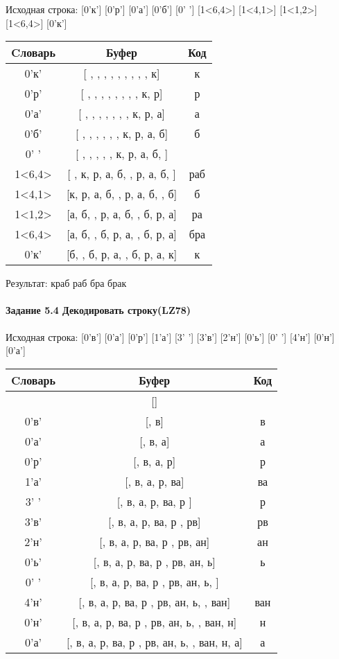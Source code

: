 \documentclass[a4paper, 12pt]{article}
\begin{document}
Исходная строка: [0'к'] [0'р'] [0'а'] [0'б'] [0' '] [1<6,4>] [1<4,1>] [1<1,2>] [1<6,4>] [0'к']\\
\begin{table}[h!]
\centering
\begin{tabular}{|c|c|c|}
\hline
 Cловарь & Буфер & Код  \\ \hline
0'к' & [ ,  ,  ,  ,  ,  ,  ,  ,  , к] & к
\\ \hline
0'р' & [ ,  ,  ,  ,  ,  ,  ,  , к, р] & р
\\ \hline
0'а' & [ ,  ,  ,  ,  ,  ,  , к, р, а] & а
\\ \hline
0'б' & [ ,  ,  ,  ,  ,  , к, р, а, б] & б
\\ \hline
0' ' & [ ,  ,  ,  ,  , к, р, а, б,  ] &  
\\ \hline
1<6,4> & [ , к, р, а, б,  , р, а, б,  ] & раб 
\\ \hline
1<4,1> & [к, р, а, б,  , р, а, б,  , б] & б
\\ \hline
1<1,2> & [а, б,  , р, а, б,  , б, р, а] & ра
\\ \hline
1<6,4> & [а, б,  , б, р, а,  , б, р, а] &  бра
\\ \hline
0'к' & [б,  , б, р, а,  , б, р, а, к] & к
\\ \hline
\end{tabular}
\end{table}

Результат: краб раб бра брак
\pagebreak
\paragraph{Задание 5.4 Декодировать строку(LZ78)\\}

Исходная строка: [0'в'] [0'а'] [0'р'] [1'а'] [3' '] [3'в'] [2'н'] [0'ь'] [0' '] [4'н'] [0'н'] [0'а']\\
\begin{table}[h!]
\centering
\begin{tabular}{|c|c|c|}
\hline
 Cловарь & Буфер & Код  \\ \hline
 & [] & 
\\ \hline
0'в' & [, в] & в
\\ \hline
0'а' & [, в, а] & а
\\ \hline
0'р' & [, в, а, р] & р
\\ \hline
1'а' & [, в, а, р, ва] & ва
\\ \hline
3' ' & [, в, а, р, ва, р ] & р 
\\ \hline
3'в' & [, в, а, р, ва, р , рв] & рв
\\ \hline
2'н' & [, в, а, р, ва, р , рв, ан] & ан
\\ \hline
0'ь' & [, в, а, р, ва, р , рв, ан, ь] & ь
\\ \hline
0' ' & [, в, а, р, ва, р , рв, ан, ь,  ] &  
\\ \hline
4'н' & [, в, а, р, ва, р , рв, ан, ь,  , ван] & ван
\\ \hline
0'н' & [, в, а, р, ва, р , рв, ан, ь,  , ван, н] & н
\\ \hline
0'а' & [, в, а, р, ва, р , рв, ан, ь,  , ван, н, а] & а
\\ \hline
\end{tabular}
\end{table}
\end{document}
